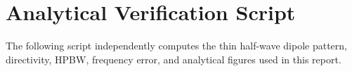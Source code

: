 \chapter{Analytical Verification Script}
\label{app:analytical-verification}

The following script independently computes the thin half-wave dipole pattern,
directivity, HPBW, frequency error, and analytical figures used in this report.




